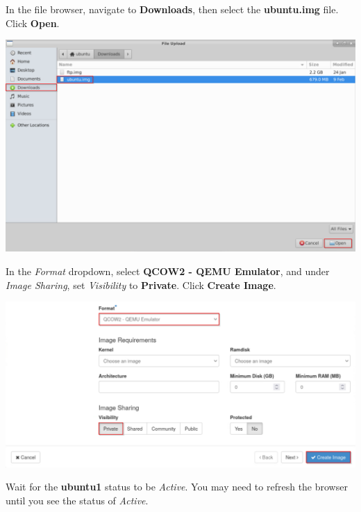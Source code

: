 \documentclass[letterpaper, 12pt]{article}
\begin{document}
\begin{enumerate}
    \begin{labstep}
        In the file browser, navigate to \textbf{Downloads}, then select the \textbf{ubuntu.img} file.
        Click \textbf{Open}.

        \begin{center}
            \includegraphics[width=\linewidth]{images/part1/step7.png}
        \end{center}
    \end{labstep}

    \begin{labstep}
        In the \textit{Format} dropdown, select \textbf{QCOW2 - QEMU Emulator}, and under \textit{Image Sharing}, set \textit{Visibility} to \textbf{Private}. %
        Click \textbf{Create Image}.

        \begin{center}
            \includegraphics[width=\linewidth]{images/part1/step8.png}
        \end{center}
    \end{labstep}

    \begin{stopbox}
        Wait for the \textbf{ubuntu1} status to be \textit{Active}.
        You may need to refresh the browser until you see the status of \textit{Active}.
    \end{stopbox}


\end{enumerate}
\end{document}
